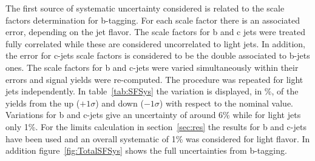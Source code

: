 \begin{table*}[htbH]
\begin{center}
\caption{Mean value and standard deviation from linear fit, from gaussian fit of MC mass points after full selection.\label{tab:LinearSignalWidths}}
\end{center}
\end{table*}

The first source of systematic uncertainty considered is related to the scale factors determination for b-tagging. For each scale factor there is an associated error, depending on the jet flavor. The scale factors for b and c jets were treated fully correlated while these are considered uncorrelated to light jets. In addition, the error for c-jets scale factors is considered to be the double associated to b-jets ones. The scale factors for b and c-jets were varied simultaneously within their errors and signal yields were re-computed. The procedure was repeated for light jets independently. In table~\ref{tab:SFSys} the variation is displayed, in \%, of the yields from the up ($+1\sigma$) and down ($-1\sigma$) with respect to the nominal value. Variations for b and c-jets give an uncertainty of around 6\% while for light jets only 1\%. For the limits calculation in section~\ref{sec:res} the results for b and c-jets have been used and an overall systematic of 1\% was considered for light flavor. In addition figure~\ref{fig:TotalSFSys} shows the full uncertainties from b-tagging.

